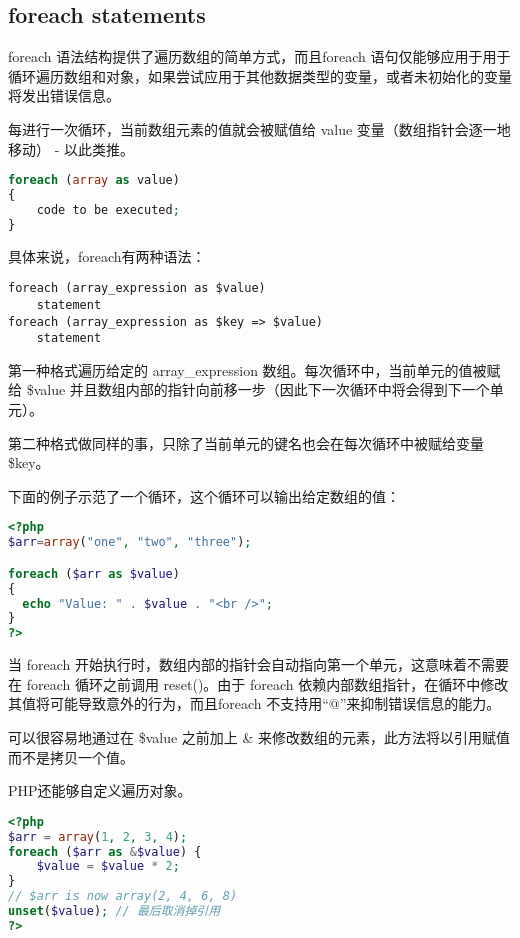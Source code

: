 \subsection{foreach statements}

foreach 语法结构提供了遍历数组的简单方式，而且foreach 语句仅能够应用于用于循环遍历数组和对象，如果尝试应用于其他数据类型的变量，或者未初始化的变量将发出错误信息。

每进行一次循环，当前数组元素的值就会被赋值给 value 变量（数组指针会逐一地移动） - 以此类推。


\begin{lstlisting}[language=PHP]
foreach (array as value)
{
    code to be executed;
}
\end{lstlisting}

具体来说，foreach有两种语法：

\begin{verbatim}
foreach (array_expression as $value)
    statement
foreach (array_expression as $key => $value)
    statement
\end{verbatim}

第一种格式遍历给定的 array\_expression 数组。每次循环中，当前单元的值被赋给 \$value 并且数组内部的指针向前移一步（因此下一次循环中将会得到下一个单元）。

第二种格式做同样的事，只除了当前单元的键名也会在每次循环中被赋给变量 \$key。




下面的例子示范了一个循环，这个循环可以输出给定数组的值：

\begin{lstlisting}[language=PHP]
<?php
$arr=array("one", "two", "three");

foreach ($arr as $value)
{
  echo "Value: " . $value . "<br />";
}
?>
\end{lstlisting}


当 foreach 开始执行时，数组内部的指针会自动指向第一个单元，这意味着不需要在 foreach 循环之前调用 reset()。由于 foreach 依赖内部数组指针，在循环中修改其值将可能导致意外的行为，而且foreach 不支持用“@”来抑制错误信息的能力。


可以很容易地通过在 \$value 之前加上 \& 来修改数组的元素，此方法将以引用赋值而不是拷贝一个值。


PHP还能够自定义遍历对象。



\begin{lstlisting}[language=PHP]
<?php
$arr = array(1, 2, 3, 4);
foreach ($arr as &$value) {
    $value = $value * 2;
}
// $arr is now array(2, 4, 6, 8)
unset($value); // 最后取消掉引用
?>
\end{lstlisting}

